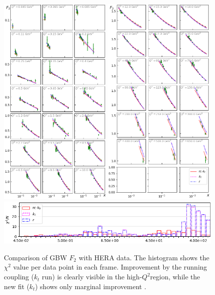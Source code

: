 \documentclass[11pt]{article}
\numberwithin{equation}{section}
\numberwithin{table}{section}
\numberwithin{figure}{section}
\begin{document}
\begin{figure}[p]
\includegraphics[width=0.49\textwidth]{./plots/Figure_1.png}
\includegraphics[width=0.49\textwidth]{./plots/Figure_2.png}
\includegraphics[width=\textwidth]{./plots/Figure_3.png}
\vspace{2mm}
\caption{Comparison of GBW $F_2$ with HERA data. The histogram shows the $\chi^2$ value per data point in each frame.
 Improvement by the running coupling ($k_t$ run) is clearly visible in the high-$Q^2$region, while the new fit ($k_t$) shows only marginal improvement .  }
\label{fig:GBW-Grid}
\end{figure}
\end{document}
